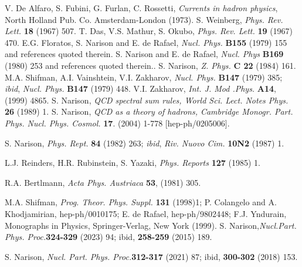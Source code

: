\begin{thebibliography}{999}
\vspace*{-0.15cm}
 V. De Alfaro, S. Fubini, G. Furlan, C. Rossetti, {\it Currents in hadron physics}, North Holland Pub. Co. Amsterdam-London (1973). 
S. Weinberg, {\it Phys. Rev. Lett.} {\bf 18} (1967) 507.
T. Das, V.S. Mathur, S. Okubo, {\it Phys. Rev. Lett.} {\bf 19} (1967) 470.
E.G. Floratos, S. Narison and E. de Rafael, {\it Nucl. Phys.} {\bf B155} (1979) 155 and references quoted therein.
S. Narison and E. de Rafael, {\it Nucl. Phys} {\bf B169} (1980) 253 and references quoted therein..
 S. Narison, {\it Z. Phys.} {\bf C 22} (1984) 161.
M.A. Shifman, A.I. Vainshtein, V.I. Zakharov, {\it Nucl. Phys.} {\bf B147} (1979) 385; {\it ibid}, 
{\it Nucl. Phys.} {\bf B147} (1979) 448.
V.I. Zakharov, 
{\it Int. J. Mod .Phys.} {\bf  A14}, (1999) 4865.
  S. Narison, {\it QCD spectral sum rules, World Sci. Lect. Notes Phys.} {\bf 26} (1989) 1.
S. Narison, {\it QCD as a theory of hadrons, Cambridge Monogr. Part. Phys. Nucl. Phys. Cosmol.} {\bf 17}.
 (2004) 1-778 [hep-ph/0205006]. 
 
  S. Narison, {\it Phys. Rept.}  {\bf 84} (1982) 263; {\it ibid}, {\it Riv. Nuovo Cim.} {\bf 10N2} (1987) 1. 
 
  L.J. Reinders, H.R. Rubinstein, S. Yazaki, {\it Phys. Reports} {\bf127} (1985) 1. 
 
 R.A. Bertlmann, {\it Acta Phys. Austriaca} {\bf 53}, (1981) 305. 

 M.A. Shifman, {\it Prog. Theor. Phys. Suppl.} {\bf 131} (1998)1;
P. Colangelo and A. Khodjamirian, hep-ph/0010175; 
E. de Rafael, hep-ph/9802448; F.J. Yndurain, Monographs in Physics, Springer-Verlag, New York (1999).
    S. Narison,{\it Nucl.Part. Phys. Proc.}{\bf 324-329} (2023) 94;
  ibid, {\bf 258-259} (2015) 189. 

 S. Narison, {\it Nucl. Part. Phys. Proc.}{\bf  312-317} (2021) 87;  
 ibid, {\bf 300-302} (2018) 153. 


\end{thebibliography}
